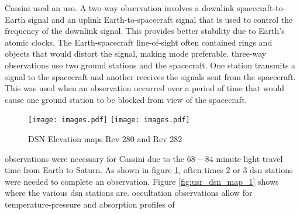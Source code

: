\documentclass{article}
\begin{document}
                Cassini used an \gls{uso}.
                A \gls{two-way observation} involves a
                \gls{downlink} spacecraft-to-Earth signal
                and an \gls{uplink} Earth-to-spacecraft signal
                that is used to control the frequency of the
                \gls{downlink} signal. This provides better
                stability due to Earth's atomic clocks. The
                Earth-spacecraft line-of-sight often contained
                rings and objects that would distort the signal,
                making 
                mode preferable. \Glspl{three-way observation}
                use two ground stations and the spacecraft.
                One station transmits a signal to the
                spacecraft and another receives the signals
                sent from the spacecraft. This was used when
                an observation occurred over a period of time
                that would cause one ground station to be
                blocked from view of the spacecraft.
                \begin{figure}[H]
                    \centering
                    \captionsetup{type=figure}
                	\texttt{[image: images.pdf]}
                    \hfill
                    \texttt{[image: images.pdf]}
                	\caption{%
                	    DSN Elevation maps Rev 280 and Rev 282
                    }
                	\label{fig:usr_dsn_elav_map_1}
                \end{figure}
                observations were necessary for Cassini due to the
                $68-84$ minute light travel time from Earth to
                Saturn. As shown in figure
                \ref{fig:usr_dsn_elav_map_1}, often times $2$ or
                $3$ \gls{dsn} stations were needed to complete an
                observation. Figure \ref{fig:usr_dsn_map_1} shows
                where the various \gls{dsn} stations are.
                \Gls{occultation} observations allow for
                        {temperature-pressure}
                and \glspl{absorption profile} of
\end{document}
